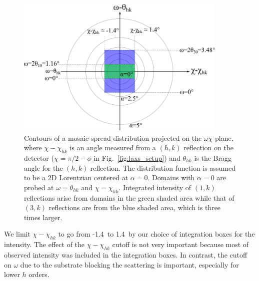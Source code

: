 \begin{figure}[htbp]
  \centering
  \includegraphics[width=0.9\textwidth]{figures/ripple/analysis/mosaic_contour}
  \caption[Contours of a mosaic spread distribution projected on the $\omega\chi$-plane,
  where $\chi-\chi_{hk}$ is an angle measured from a $(h,k)$ reflection on the detector
  ($\chi=\pi/2-\phi$ in Fig.~\ref{fig:laxs_setup}) and $\theta_{hk}$ is the
  Bragg angle for the $(h,k)$ reflection]
  {Contours of a mosaic spread distribution projected on the $\omega\chi$-plane,
  where $\chi-\chi_{hk}$ is an angle measured from a $(h,k)$ reflection on the detector
  ($\chi=\pi/2-\phi$ in Fig.~\ref{fig:laxs_setup}) and $\theta_{hk}$ is the
  Bragg angle for the $(h,k)$ reflection.
  The distribution function is assumed to be a 2D Lorentzian centered at $\alpha=0$.
  Domains with $\alpha=0$ are probed at $\omega=\theta_{hk}$ and $\chi=\chi_{hk}$.
  Integrated intensity of $(1,k)$ reflections arise from domains in the green
  shaded area while that of $(3,k)$ reflections are from the
  blue shaded area, which is three times larger.}
  \label{fig:mosaic_contour} 
\end{figure}

We limit $\chi-\chi_{hk}$ to go from -1.4\textdegree\ to 1.4\textdegree\
by our choice of integration boxes for the intensity.  
The effect of the $\chi-\chi_{hk}$ cutoff is not very important
because most of observed intensity was included in the integration boxes.
In contrast, the cutoff on $\omega$ due to the
substrate blocking the scattering
is important, especially for lower $h$ orders.
 
